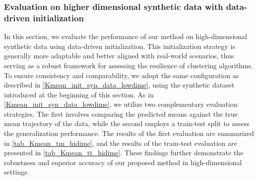 \documentclass{article}
\begin{document}
\subsubsection{Evaluation on higher dimensional synthetic data with data-driven initialization}
In this section, we evaluate the performance of our method on high-dimensional synthetic data using data-driven initialization. This initialization strategy is generally more adaptable and better aligned with real-world scenarios, thus serving as a robust framework for assessing the resilience of clustering algorithms. To ensure consistency and comparability, we adopt the same configuration as described in \cref{Kmean_init_syn_data_lowdime}, using the synthetic dataset introduced at the beginning of this section.
As in \cref{Kmean_init_syn_data_lowdime}, we utilize two complementary evaluation strategies. The first involves comparing the predicted means against the true mean trajectory of the data, while the second employs a train-test split to assess the generalization performance. The results of the first evaluation are summarized in \cref{tab_Kmean_tm_hidime}, and the results of the train-test evaluation are presented in \cref{tab_Kmean_tt_hidime}. These findings further demonstrate the robustness and superior accuracy of our proposed method in high-dimensional settings.
\end{document}
